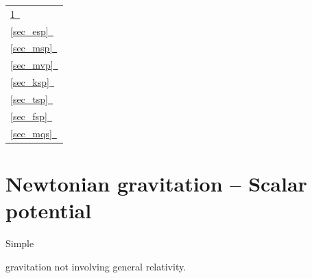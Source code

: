 \documentclass[letterpaper]{article}
\begin{document}
\begin{tabular}{l}
\hyperlink{sec_gsp}{\ref{sec_gsp}~\nameref{sec_gsp}} \\
\hyperlink{sec_esp}{\ref{sec_esp}~\nameref{sec_esp}} \\
\hyperlink{sec_msp}{\ref{sec_msp}~\nameref{sec_msp}} \\
\hyperlink{sec_mvp}{\ref{sec_mvp}~\nameref{sec_mvp}} \\
\hyperlink{sec_ksp}{\ref{sec_ksp}~\nameref{sec_ksp}} \\
\hyperlink{sec_tsp}{\ref{sec_tsp}~\nameref{sec_tsp}} \\
\hyperlink{sec_fsp}{\ref{sec_fsp}~\nameref{sec_fsp}} \\
\hyperlink{sec_mqs}{\ref{sec_mqs}~\nameref{sec_mqs}} \\
\end{tabular}





\clearpage
\section{Newtonian gravitation -- Scalar potential}
\label{sec_gsp}

\hypertarget{sec_gsp}{Simple} gravitation not involving general relativity.
\end{document}
